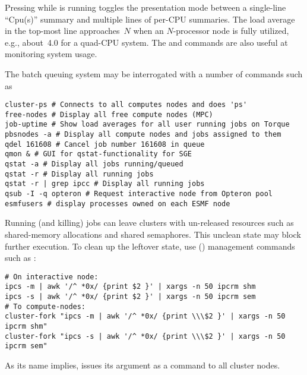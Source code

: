 \documentclass[12pt,twoside]{article}
\begin{document}
Pressing  while  is running toggles the
presentation mode between a single-line ``Cpu(s)'' summary and 
multiple lines of per-CPU summaries. 
The load average in the top-most line approaches~$N$ when an
$N$-processor node is fully utilized, e.g., about~4.0 for a quad-CPU
system. 
The  and  commands are also useful
at monitoring system usage.

The  batch queuing system may be interrogated with a
number of commands such as 
\begin{verbatim}
cluster-ps # Connects to all computes nodes and does 'ps'
free-nodes # Display all free compute nodes (MPC)
job-uptime # Show load averages for all user running jobs on Torque
pbsnodes -a # Display all compute nodes and jobs assigned to them
qdel 161608 # Cancel job number 161608 in queue
qmon & # GUI for qstat-functionality for SGE
qstat -a # Display all jobs running/queued
qstat -r # Display all running jobs
qstat -r | grep ipcc # Display all running jobs
qsub -I -q opteron # Request interactive node from Opteron pool
esmfusers # display processes owned on each ESMF node
\end{verbatim}

Running (and killing)  jobs can leave clusters with
un-released resources such as shared-memory allocations and shared
semaphores.
This unclean state may block further  execution.
To clean up the leftover state, use 
 () management
commands such as :
\begin{verbatim}
# On interactive node:
ipcs -m | awk '/^ *0x/ {print $2 }' | xargs -n 50 ipcrm shm
ipcs -s | awk '/^ *0x/ {print $2 }' | xargs -n 50 ipcrm sem
# To compute-nodes:
cluster-fork "ipcs -m | awk '/^ *0x/ {print \\\$2 }' | xargs -n 50 ipcrm shm"
cluster-fork "ipcs -s | awk '/^ *0x/ {print \\\$2 }' | xargs -n 50 ipcrm sem"
\end{verbatim}
As its name implies,  issues its argument as a
command to all cluster nodes.
\end{document}
